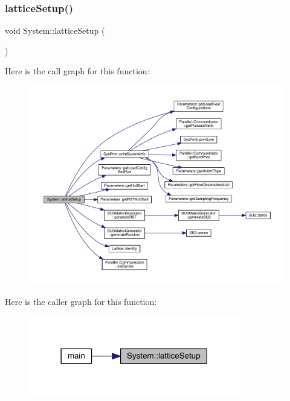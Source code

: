 \subsubsection{\texorpdfstring{latticeSetup()}{latticeSetup()}}
{\footnotesize\ttfamily void System\+::lattice\+Setup (\begin{DoxyParamCaption}{ }\end{DoxyParamCaption})}

Here is the call graph for this function\+:\nopagebreak
\begin{figure}[H]
\begin{center}
\leavevmode
\includegraphics[width=350pt]{class_system_a93c8a8258ac8f6382ec393bca1271011_cgraph}
\end{center}
\end{figure}
Here is the caller graph for this function\+:\nopagebreak
\begin{figure}[H]
\begin{center}
\leavevmode
\includegraphics[width=261pt]{class_system_a93c8a8258ac8f6382ec393bca1271011_icgraph}
\end{center}
\end{figure}
\mbox{\label{class_system_afa39feb75f96798930f4bfb48205f40b}} 
